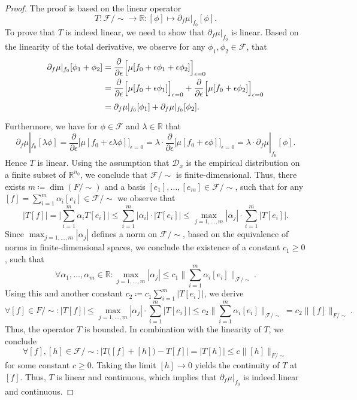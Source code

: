 \documentclass[11pt, a4paper]{article}
\newcommand{\R}{\mathbb{R}}
\newcommand{\D}{\mathcal{D}}
\newcommand{\F}{\mathcal{F}}
\begin{document}
\begin{proof}
The proof is based on the linear operator
\[ T : \F / {\sim} \to \R : [\phi] \mapsto \partial_f \mu |_{f_0} [\phi]. \]
To prove that $T$ is indeed linear, we need to show that $\partial_f \mu |_{f_0}$ is linear. Based on the linearity of the total derivative, we observe for any $\phi_1, \phi_2 \in \F$, that
\[ \begin{split}
\partial_f \mu |_{f_0} [\phi_1 + \phi_2] 
&= \frac{\partial}{\partial \epsilon} \Big [ \mu[f_0+\epsilon \phi_1 + \epsilon \phi_2 ] \Big ]_{\epsilon=0} \\\
&= \frac{\partial}{\partial \epsilon} \Big [ \mu[f_0+\epsilon \phi_1] \Big ]_{\epsilon=0} + \frac{\partial}{\partial \epsilon} \Big [ \mu[f_0+\epsilon \phi_2] \Big ]_{\epsilon=0} \\\
\textcolor{white}{\Big |} &= \partial_f \mu |_{f_0} [\phi_1] + \partial_f \mu |_{f_0} [\phi_2].
\end{split} \]
Furthermore, we have for $\phi \in \F$ and $\lambda \in \R$ that
\[ \partial_f \mu |_{f_0} [\lambda \phi] = \frac{\partial}{\partial \epsilon} \Big [ \mu[f_0+\epsilon \lambda \phi ] \Big ]_{\epsilon=0} = \lambda \cdot \frac{\partial}{\partial \epsilon} \Big [ \mu[f_0+\epsilon \phi ] \Big ]_{\epsilon=0} = \lambda \cdot \partial_f \mu |_{f_0} [\phi]. \]
Hence $T$ is linear. Using the assumption that $\D_x$ is the empirical distribution on a finite subset of $\R^{n_0}$, we conclude that $\F /{\sim}$ is finite-dimensional. Thus, there exists $m \coloneq \dim(F/{\sim})$ and a basis $[e_1], \dots, [e_m] \in \F / {\sim}$, such that for any $[f] = \sum_{i=1}^{m}\alpha_i[e_i] \in \F/{\sim}$ we observe that
\[ \big | T[f] \big | = \Big | \sum_{i=1}^{m} \alpha_iT[e_i] \Big | \leq \sum_{i=1}^{m} \big | \alpha_i \big | \cdot \big | T[e_i] \big | \leq \max_{j=1,\dots,m} | \alpha_j | \cdot \sum_{i=1}^{m} \big | T[e_i] \big |. \]
Since $\max_{j=1,\dots,m} | \alpha_j |$ defines a norm on $\F/{\sim}$, based on the equivalence of norms in finite-dimensional spaces, we conclude the existence of a constant $c_1 \geq 0$, such that
\[ \forall \alpha_1, \dots, \alpha_m \in \R : \max_{j=1,\dots,m} | \alpha_j | \leq c_1 \Big \| \sum_{i=1}^{m} \alpha_i [e_i] \Big \|_{\F/{\sim}}. \]
Using this and another constant $c_2 \coloneq c_1 \sum_{i=1}^{m} \big | T [e_i] \big |$, we derive
\[ \forall [f] \in F/{\sim} : \big | T [f] \big | \leq \max_{j=1,\dots,m} | \alpha_j | \cdot \sum_{i=1}^{m} \big | T[e_i] \big | \leq c_2 \Big \| \sum_{i=1}^{m} \alpha_i [e_i] \Big \|_{\F/{\sim}} = c_2 \big \| [f] \big \|_{F/{\sim}}. \]
Thus, the operator $T$ is bounded. In combination with the linearity of $T$, we conclude
\[ \forall [f], [h] \in \F/{\sim} : \Big | T \big ( [f] + [h] \big ) - T [f] \Big | = \Big | T [h] \Big | \leq c \big \| [h] \big \|_{F/{\sim}} \]
for some constant $c \geq 0$. Taking the limit $[h] \to 0$ yields the continuity of $T$ at $[f]$. Thus, $T$ is linear and continuous, which implies that $\partial_f\mu |_{f_0}$ is indeed linear and continuous.
\end{proof}
\end{document}
